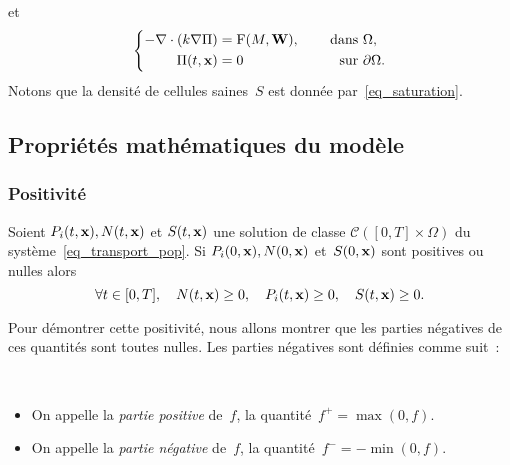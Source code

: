 \documentclass[main.tex]{subfiles}
\begin{document}
et
\begin{equation}
\left\{ \begin{aligned}
 \label{eq_pression}
 -\nabla\cdot\left(k\nabla \Pi\right) &={\rm F}(M,{\bf W}), &\quad \textrm{ dans } & \Omega , \\
    \Pi(t,\mathbf{x}) &=0 & \quad \textrm{ sur  }& \partial \Omega.
\end{aligned}
\right. \end{equation}
Notons que la densité de cellules saines~$S$ est donnée par~\eqref{eq_saturation}.


\subsection{Propriétés mathématiques du modèle}
\subsubsection{Positivité}
\begin{prop}\label{prop:positivite_modele}
Soient $P_i(t,\mathbf{x}), N(t,\mathbf{x}) $ et $S(t,\mathbf{x})$ une solution de classe $\mathscr{C}([0,T]\times \Omega)$ du système~\eqref{eq_transport_pop}. 
Si $P_i(0,\mathbf{x}), N(0,\mathbf{x})$ et~$S(0,\mathbf{x})$ sont positives ou nulles alors 
$$\forall t \in [0,T], \quad  N(t,\mathbf{x})\geq0, \quad  P_i(t,\mathbf{x})\geq0, \quad S(t,\mathbf{x})\geq0. $$
\end{prop}
Pour démontrer cette positivité, nous allons montrer que les parties négatives de ces quantités sont toutes nulles. Les parties négatives sont définies comme suit~:
\begin{dfn}~
\begin{itemize}
\item On appelle la \emph{partie positive} de~$f$, la quantité~$f^+=\max(0,f)$.
\item On appelle la \emph{partie négative} de~$f$, la quantité~$f^-=-\min(0,f)$.
\end{itemize}
\end{dfn}
\end{document}
